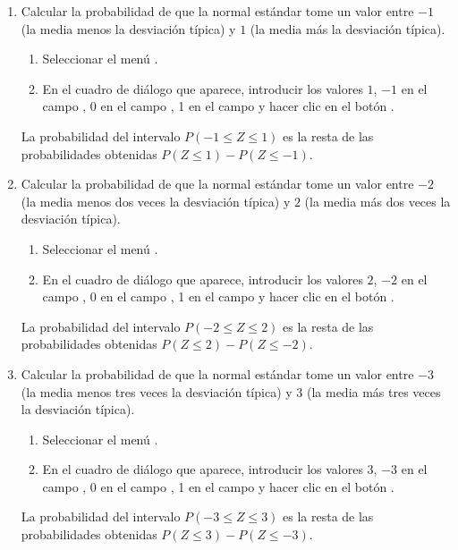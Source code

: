 \begin{enumerate}[leftmargin=*]
\begin{enumerate}
\item Calcular la probabilidad de que la normal estándar tome un valor entre $-1$ (la media menos la desviación típica)
y $1$ (la media más la desviación típica).
\begin{indicacion}{
\begin{enumerate}
\item Seleccionar el menú .
\item En el cuadro de diálogo que aparece, introducir los valores $1$, $-1$ en el campo ,
0 en el campo , 1 en el campo  y hacer clic en el botón .
\end{enumerate}
La probabilidad del intervalo $P(-1\leq Z\leq 1)$ es la resta de las probabilidades obtenidas $P(Z\leq 1)-P(Z\leq -1)$.
}
\end{indicacion}

\item Calcular la probabilidad de que la normal estándar tome un valor entre $-2$ (la media menos dos veces la desviación típica) y $2$ (la
media más dos veces la desviación típica). 
\begin{indicacion}{
\begin{enumerate}
\item Seleccionar el menú .
\item En el cuadro de diálogo que aparece, introducir los valores $2$, $-2$ en el campo ,
0 en el campo , 1 en el campo  y hacer clic en el botón .
\end{enumerate}
La probabilidad del intervalo $P(-2\leq Z\leq 2)$ es la resta de las probabilidades obtenidas $P(Z\leq 2)-P(Z\leq -2)$.
}
\end{indicacion}

\item Calcular la probabilidad de que la normal estándar tome un valor entre $-3$ (la media menos tres veces la desviación típica) y $3$ (la
media más tres veces la desviación típica). 
\begin{indicacion}{
\begin{enumerate}
\item Seleccionar el menú .
\item En el cuadro de diálogo que aparece, introducir los valores $3$, $-3$ en el campo ,
0 en el campo , 1 en el campo  y hacer clic en el botón .
\end{enumerate}
La probabilidad del intervalo $P(-3\leq Z\leq 3)$ es la resta de las probabilidades obtenidas $P(Z\leq 3)-P(Z\leq -3)$.
}
\end{indicacion}


\end{enumerate}
\end{enumerate}
